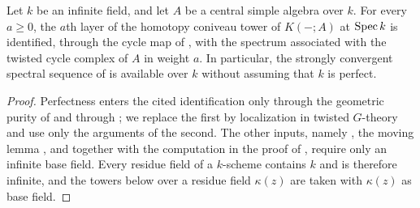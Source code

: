 \begin{lemma}\label{lem:app-twisted-tower}
Let $k$ be an infinite field, and let $A$ be a central simple algebra over $k$.
For every $a\ge0$, the $a$th layer of the homotopy coniveau tower of $K(-;A)$ at $\operatorname{Spec} k$ is identified, through the cycle map of \cite[\S6.2]{KahnLevine2010}, with the spectrum associated with the twisted cycle complex of $A$ in weight $a$.
In particular, the strongly convergent spectral sequence of \cite[Remark 6.1.2, Corollary 6.1.4]{KahnLevine2010} is available over $k$ without assuming that $k$ is perfect.
\end{lemma}
\begin{proof}
Perfectness enters the cited identification only through the geometric purity of \cite[Corollaries 4.2.3--4.2.4]{LevineHomotopyConiveau} and through \cite[\S5.2]{LevineHomotopyConiveau}; we replace the first by localization in twisted $G$-theory and use only the arguments of the second.
The other inputs, namely \cite[Corollary 3.2.2, Theorem 4.1.1]{LevineHomotopyConiveau}, the moving lemma \cite[Theorem 3.3.5]{LevineMovingLemma}, and \cite[Corollary 6.3.3, Proposition B.5]{KahnLevine2010} together with the computation in the proof of \cite[Lemma 6.4.3]{KahnLevine2010}, require only an infinite base field.
Every residue field of a $k$-scheme contains $k$ and is therefore infinite, and the towers below over a residue field $\kappa(z)$ are taken with $\kappa(z)$ as base field.


\end{proof}
